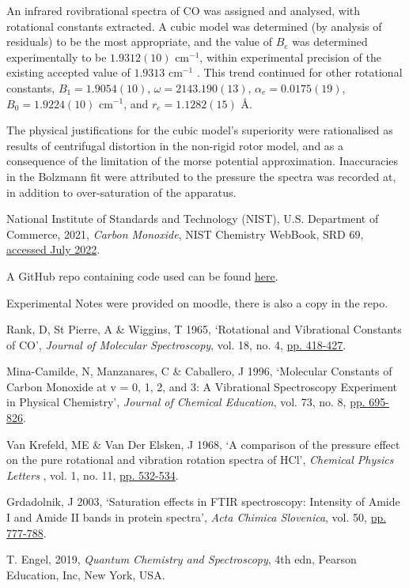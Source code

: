\documentclass[aps,prl,reprint,10pt,amsmath,amssymb,superscriptaddress,a4paper]{revtex4-2}
\begin{document}
An infrared rovibrational spectra of CO was assigned and analysed, with rotational constants extracted. A cubic model was determined (by analysis of residuals) to be the most appropriate, and the value of $B_e$ was determined experimentally to be $1.9312(10)$ cm$^{-1}$, within experimental precision of the existing accepted value of $1.9313$ cm$^{-1}$ \cite{NIST}. This trend continued for other rotational constants, $B_1 = 1.9054(10)$, $\omega = 2143.190(13)$, $\alpha_e = 0.0175(19)$, $B_0 = 1.9224(10)$ cm$^{-1}$, and $r_e = 1.1282(15)$ \AA.

The physical justifications for the cubic model's superiority were rationalised as results of centrifugal distortion in the non-rigid rotor model, and as a consequence of the limitation of the morse potential approximation. Inaccuracies in the Bolzmann fit were attributed to the pressure the spectra was recorded at, in addition to over-saturation of the apparatus. 

\begin{thebibliography}{99}

 National Institute of Standards and Technology (NIST), U.S. Department of Commerce, 2021, {\it Carbon Monoxide}, NIST Chemistry WebBook, SRD 69, \href{https://webbook.nist.gov/cgi/cbook.cgi?ID=C630080}{accessed July 2022}. 

 A GitHub repo containing code used can be found \href{https://github.com/Sam-js2/CHEM2011-Lab-Report}{here}.

 Experimental Notes were provided on moodle, there is also a copy in the repo\cite{GitHub}.

 Rank, D, St Pierre, A \& Wiggins, T 1965, ‘Rotational and Vibrational Constants of CO’, {\it Journal of Molecular Spectroscopy}, vol. 18, no. 4, \href{https://www.sciencedirect.com/science/article/abs/pii/0022285265900482}{pp. 418-427}.

 Mina-Camilde, N, Manzanares, C \& Caballero, J 1996, ‘Molecular Constants of Carbon Monoxide at v = 0, 1, 2, and 3: A Vibrational Spectroscopy Experiment in Physical Chemistry’, {\it Journal of Chemical Education}, vol. 73, no. 8, \href{https://doi.org/10.1021/ed073p804}{pp. 695-826}. 

 Van Krefeld, ME \& Van Der Elsken, J 1968, ‘A comparison of the pressure effect on the pure rotational and vibration rotation spectra of HCl’, {\it Chemical Physics Letters }, vol. 1, no. 11, \href{ https://www.sciencedirect.com/science/article/pii/0009261468800119}{pp. 532-534}.

 Grdadolnik, J 2003, ‘Saturation effects in FTIR spectroscopy: Intensity of Amide I and Amide II bands in protein spectra’, {\it Acta Chimica Slovenica}, vol. 50, \href{ https://www.researchgate.net/publication/228541251_Saturation_effects_in_FTIR_spectroscopy_Intensity_of_Amide_I_and_Amide_II_bands_in_protein_spectra }{pp. 777-788}.

 T. Engel, 2019, {\it Quantum Chemistry and Spectroscopy}, 4th edn, Pearson Education, Inc, New York, USA.

\end{thebibliography}
\end{document}
